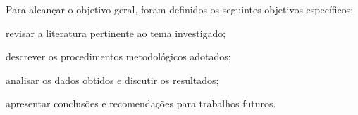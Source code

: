 %

Para alcançar o objetivo geral, foram definidos os seguintes objetivos específicos:

\begin{alineas}
	\item revisar a literatura pertinente ao tema investigado;
	\item descrever os procedimentos metodológicos adotados;
	\item analisar os dados obtidos e discutir os resultados;
	\item apresentar conclusões e recomendações para trabalhos futuros.
\end{alineas}
